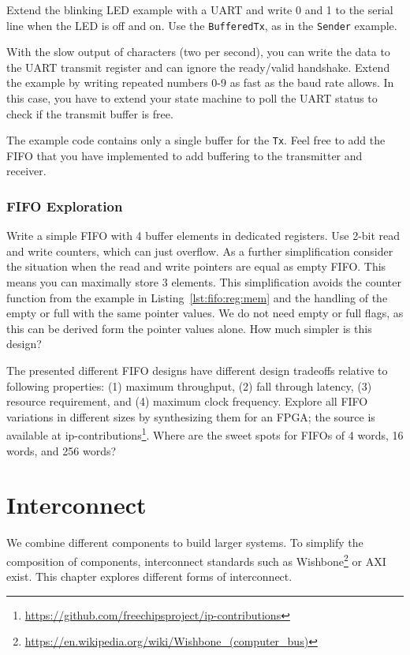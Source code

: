 \documentclass[%
    10pt,
    headinclude, footexclude,
    openright, %
    notitlepage,
    cleardoubleempty,
    headsepline,
    pointlessnumbers,
    bibtotoc, idxtotoc,
    ]{scrbook}
\newcommand{\code}[1]{{\small{\texttt{#1}}}}
\newcommand{\myref}[2]{\href{#1}{#2}}
\renewcommand{\myref}[2]{{#2}{\footnote{\url{#1}}}}
\begin{document}
Extend the blinking LED example with a UART and write 0 and 1 to the serial
line when the LED is off and on. Use the \code{BufferedTx}, as in the \code{Sender}
example.

With the slow output of characters (two per second), you can write the data
to the UART transmit register and can ignore the ready/valid handshake.
Extend the example by writing repeated numbers 0-9 as fast as the baud rate allows.
In this case, you have to extend your state machine to poll the UART status
to check if the transmit buffer is free.

The example code contains only a single buffer for the \code{Tx}. Feel free to
add the FIFO that you have implemented to add buffering to the transmitter
and receiver.

\subsection{FIFO Exploration}

Write a simple FIFO with 4 buffer elements in dedicated registers.
Use 2-bit read and write counters, which can just overflow.
As a further simplification consider the situation when the read and write
pointers are equal as empty FIFO. This means you can maximally
store 3 elements. This simplification avoids the counter function from
the example in Listing~\ref{lst:fifo:reg:mem} and the handling
of the empty or full with the same pointer values. We do not need
empty or full flags, as this can be derived form the pointer values
alone. How much simpler is this design?

The presented different FIFO designs have different design tradeoffs
relative to following properties: (1) maximum throughput,
(2) fall through latency, (3) resource requirement, and (4)
maximum clock frequency. Explore all FIFO variations in different sizes by
synthesizing them for an FPGA; the source is available at
\myref{https://github.com/freechipsproject/ip-contributions}{ip-contributions}.
Where are the sweet spots for FIFOs of 4 words, 16 words, and 256 words?

\chapter{Interconnect}
\label{chap:interconnect}

We combine different components to build larger systems.
To simplify the composition of components, interconnect standards such as
\myref{https://en.wikipedia.org/wiki/Wishbone_(computer_bus)}{Wishbone}
or AXI exist. This chapter explores different forms of interconnect.
\end{document}

